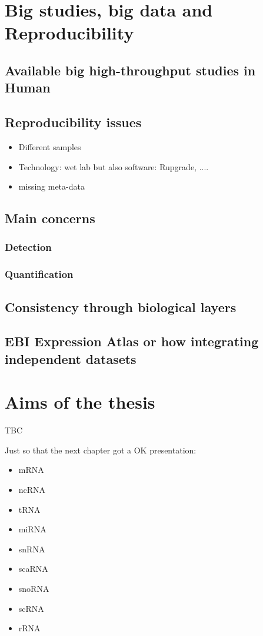 \section{Big studies, big data and Reproducibility}
    \subsection{Available big high-throughput studies in Human}
    \subsection{Reproducibility issues}
        \begin{itemize}
            \item{Different samples}
            \item{Technology: wet lab but also software: Rupgrade, ....}
            \item{missing meta-data}
        \end{itemize}
    \subsection{Main concerns}
        \subsubsection{Detection}
        \subsubsection{Quantification}
    \subsection{Consistency through biological layers}
    \subsection{EBI Expression Atlas or how integrating independent
    datasets }

\section{Aims of the thesis}

TBC


Just so that the next chapter got a OK presentation:
\begin{itemize}
    \item \gls{mRNA}
    \item \gls{ncRNA}
    \item \gls{tRNA}
    \item \gls{miRNA}
    \item \gls{snRNA}
    \item \gls{scaRNA}
    \item \gls{snoRNA}
    \item \gls{scRNA}
    \item \gls{rRNA}
\end{itemize}

